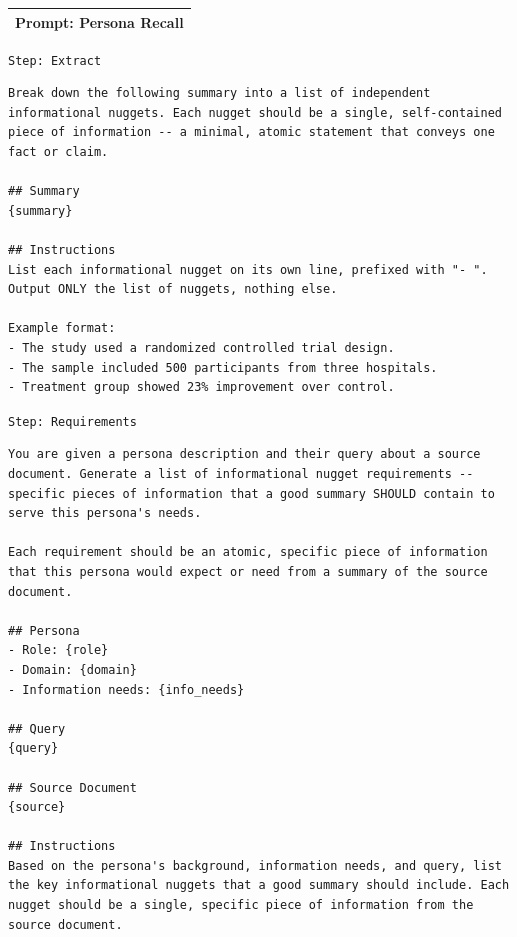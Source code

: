 \begin{table}[h]
\centering
\scriptsize
\setlength{\abovecaptionskip}{4pt}
\vspace{-4pt}
\begin{tabular}{p{}}
\toprule
\textbf{Prompt: Persona Recall} \\
\midrule
\end{tabular}

\noindent\texttt{Step: Extract}\dotfill\par
\vspace{-2pt}
\begin{lstlisting}[style=promptstyle,aboveskip=2pt,belowskip=2pt]
Break down the following summary into a list of independent informational nuggets. Each nugget should be a single, self-contained piece of information -- a minimal, atomic statement that conveys one fact or claim.

## Summary
{summary}

## Instructions
List each informational nugget on its own line, prefixed with "- ". Output ONLY the list of nuggets, nothing else.

Example format:
- The study used a randomized controlled trial design.
- The sample included 500 participants from three hospitals.
- Treatment group showed 23% improvement over control.
\end{lstlisting}
\vspace{-2pt}

\noindent\texttt{Step: Requirements}\dotfill\par
\vspace{-2pt}
\begin{lstlisting}[style=promptstyle,aboveskip=2pt,belowskip=2pt]
You are given a persona description and their query about a source document. Generate a list of informational nugget requirements -- specific pieces of information that a good summary SHOULD contain to serve this persona's needs.

Each requirement should be an atomic, specific piece of information that this persona would expect or need from a summary of the source document.

## Persona
- Role: {role}
- Domain: {domain}
- Information needs: {info_needs}

## Query
{query}

## Source Document
{source}

## Instructions
Based on the persona's background, information needs, and query, list the key informational nuggets that a good summary should include. Each nugget should be a single, specific piece of information from the source document.


\end{lstlisting}
\end{table}
